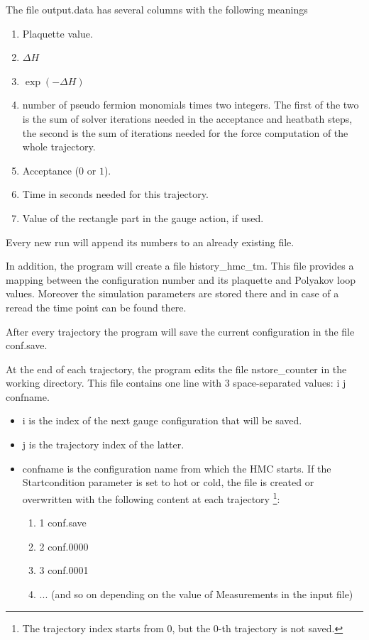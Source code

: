 The file {\ttfamily output.data} has several columns with the
following meanings
\begin{enumerate}
\item Plaquette value.
\item $\Delta H$
\item $\exp(-\Delta H)$
\item number of pseudo fermion monomials times two integers. The first
  of the two is the sum of solver iterations needed
  in the acceptance and heatbath steps, the second is the sum of 
  iterations needed for the force computation of the whole trajectory.
\item Acceptance ($0$ or $1$).
\item Time in seconds needed for this trajectory.
\item Value of the rectangle part in the gauge action, if used.
\end{enumerate}
Every new run will append its numbers to an already existing file.

In addition, the program will create a file {\ttfamily
  history\_hmc\_tm}. This file provides a mapping between the
configuration number and its plaquette and Polyakov loop
values. Moreover the simulation parameters are stored there and in
case of a reread the time point can be found there.

After every trajectory the program will save the current configuration
in the file {\ttfamily conf.save}.

At the end of each trajectory, the program edits the file {\ttfamily nstore\_counter} in the working directory.
This file contains one line with $3$ space-separated values: {\ttfamily i j confname}.
\begin{itemize}
  \item
  {\ttfamily i} is the index of the next gauge configuration that will be saved.
  \item
  {\ttfamily j} is the trajectory index of the latter.
  \item
  {\ttfamily confname} is the configuration name from which the HMC starts.
  If the {\ttfamily Startcondition} parameter is set to {\ttfamily hot} or {\ttfamily cold},
  the file is created or overwritten with the following content at each trajectory
  \footnote{The trajectory index starts from $0$, but the $0$-th trajectory is not saved.}: 
  \begin{enumerate}
    \item 
    { 1 conf.save}
    \item 
    { 2 conf.0000}
    \item
    { 3 conf.0001}
    \item
    ... (and so on depending on the value of {\ttfamily Measurements} in the input file)
  \end{enumerate}
\end{itemize}

